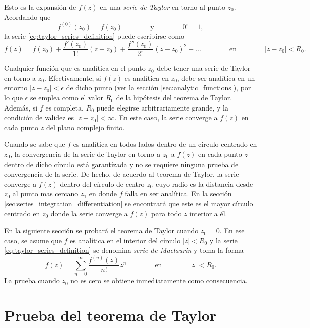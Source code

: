 \documentclass[a4paper]{report}
\begin{document}
Esto es la expansión de \(f(z)\) en una \emph{serie de Taylor} en torno al punto \(z_0\). Acordando que 
\[
 f^{(0)}(z_0)=f(z_0)
 \qquad\qquad\textrm{y}\qquad\qquad
 0!=1,
\]
la serie \ref{eq:taylor_series_definition} puede escribirse como
\[
 f(z)=f(z_0)+\frac{f'(z_0)}{1!}(z-z_0)+\frac{f''(z_0)}{2!}(z-z_0)^2+\dots
 \qquad\qquad\textrm{en}\qquad\qquad
 |z-z_0|<R_0.
\]

Cualquier función que es analítica en el punto \(z_0\) debe tener una serie de Taylor en torno a \(z_0\). Efectivamente, si \(f(z)\) es analítica en \(z_0\), debe ser analítica en un entorno \(|z-z_0|<\epsilon\) de dicho punto (ver la sección \ref{sec:analytic_functions}), por lo que \(\epsilon\) se emplea como el valor \(R_0\) de la hipótesis del teorema de Taylor. Además, si \(f\) es completa, \(R_0\) puede elegirse arbitrariamente grande, y la condición de validez es \(|z-z_0|<\infty\). En este caso, la serie converge a \(f(z)\) en cada punto \(z\) del plano complejo finito.

Cuando se sabe que \(f\) es analítica en todos lados dentro de un círculo centrado en \(z_0\), la convergencia de la serie de Taylor en torno a \(z_0\) a \(f(z)\) en cada punto \(z\) dentro de dicho círculo está garantizada y no se requiere ninguna prueba de convergencia de la serie. De hecho, de acuerdo al teorema de Taylor, la serie converge a \(f(z)\) dentro del círculo de centro \(z_0\) cuyo radio es la distancia desde \(z_0\) al punto mas cercano \(z_1\) en donde \(f\) falla en ser analítica. En la sección \ref{sec:series_integration_differentiation} se encontrará que este es el mayor círculo centrado en \(z_0\) donde la serie converge a \(f(z)\) para todo \(z\) interior a él.

En la siguiente sección se probará el teorema de Taylor cuando \(z_0=0\). En ese caso, se asume que \(f\) es analítica en el interior del círculo \(|z|<R_0\) y la serie \ref{eq:taylor_series_definition} se denomina \emph{serie de Maclaurin} y toma la forma
\begin{equation}\label{eq:maclaurin_series_definition}
 f(z)=\sum_{n=0}^\infty\frac{f^{(n)}(z)}{n!}z^n
 \qquad\qquad\textrm{en}\qquad\qquad
 |z|<R_0.
\end{equation}
La prueba cuando \(z_0\) no es cero se obtiene inmediatamente como consecuencia.

\section{Prueba del teorema de Taylor}
\end{document}
